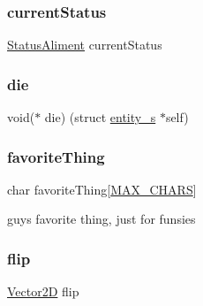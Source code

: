 \mbox{\label{structentity__s_ad5a194015ada8926cdf00ff425d04d8a}} 
\subsubsection{\texorpdfstring{current\+Status}{currentStatus}}
{\footnotesize\ttfamily \hyperlink{entity__s_8h_a0d7bb91e8dc77eb36211e30983b47be4}{Status\+Aliment} current\+Status}

\mbox{\label{structentity__s_ab7c43f12b245296f839eda999ed25896}} 
\subsubsection{\texorpdfstring{die}{die}}
{\footnotesize\ttfamily void($\ast$ die) (struct \hyperlink{structentity__s}{entity\+\_\+s} $\ast$self)}

\mbox{\label{structentity__s_ae0b5157d90563d37e8209f8ba094e494}} 
\subsubsection{\texorpdfstring{favorite\+Thing}{favoriteThing}}
{\footnotesize\ttfamily char favorite\+Thing\mbox{[}\hyperlink{entity__s_8h_a8adbf2b1e0569dded992fee665e86e70}{M\+A\+X\+\_\+\+C\+H\+A\+RS}\mbox{]}}



guy\textquotesingle{}s favorite thing, just for funsies 

\mbox{\label{structentity__s_afc50ca9ba71427ea7962929de4b0e1bb}} 
\subsubsection{\texorpdfstring{flip}{flip}}
{\footnotesize\ttfamily \hyperlink{struct_vector2_d}{Vector2D} flip}



